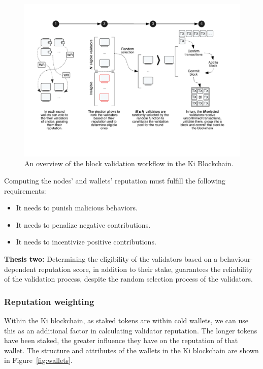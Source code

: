 \begin{figure}
	\includegraphics[width=\linewidth, trim= 1cm 3cm 1cm 2cm, clip]{Figures/workflow.pdf}
	\caption{An overview of the block validation workflow in the Ki Blockchain.}
	\label{fig:wf}
\end{figure}
						
Computing the nodes' and wallets' reputation must fulfill the following requirements: 
\begin{itemize}
    \item It needs to punish malicious behaviors.
    \item It needs to penalize negative contributions.
    \item It needs to incentivize positive contributions.
\end{itemize}

\textbf{Thesis two:} Determining the eligibility of the validators based on a behaviour-dependent reputation score, in addition to their stake, guarantees the reliability of the validation process, despite the random selection process of the validators.

\subsubsection{Reputation weighting}
\label{sec:kiblockchainwallets}
Within the Ki blockchain, as staked tokens are within cold wallets, we can use this as an additional factor in calculating validator reputation. The longer tokens have been staked, the greater influence they have on the reputation of that wallet. The structure and attributes of the wallets in the Ki blockchain are shown in Figure~\ref{fig:wallets}.

